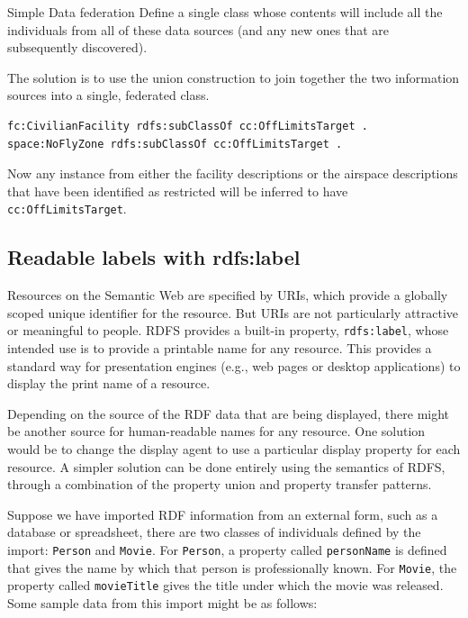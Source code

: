 \begin{challenge}{Simple Data federation}
\label{chal:8}
Define a single class whose contents will include all the individuals
from all of these data sources (and any new ones that are subsequently
discovered).

\solution

The solution is to use the union construction to join together the two
information sources into a single, federated class.

\begin{lstlisting}
fc:CivilianFacility rdfs:subClassOf cc:OffLimitsTarget .
space:NoFlyZone rdfs:subClassOf cc:OffLimitsTarget .
\end{lstlisting}

Now any instance from either the facility descriptions or the airspace
descriptions that have been identified as restricted will be inferred to
have \texttt{cc:OffLimitsTarget}.
\end{challenge}

\subsection{Readable labels with rdfs:label}

Resources on the Semantic Web are specified by URIs, which provide a
globally scoped unique identifier for the resource. But URIs are not
particularly attractive or meaningful to people. RDFS provides a
built-in property, \texttt{rdfs:label}, whose intended use is to provide a
printable name for any resource. This provides a standard way for
presentation engines (e.g., web pages or desktop applications) to
display the print name of a resource.

Depending on the source of the RDF data that are being displayed, there
might be another source for human-readable names for any resource. One
solution would be to change the display agent to use a particular
display property for each resource. A simpler solution can be done
entirely using the semantics of RDFS, through a combination of the
property union and property transfer patterns.

Suppose we have imported RDF information from an external form, such as
a database or spreadsheet, there are two classes of individuals defined
by the import: \texttt{Person} and \texttt{Movie}. For \texttt{Person}, a property called
\texttt{personName} is defined that gives the name by which that person is
professionally known. For \texttt{Movie}, the property called \texttt{movieTitle} gives
the title under which the movie was released. Some sample data from this
import might be as follows:

